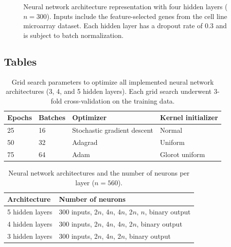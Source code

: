 \documentclass[10pt, letterpaper]{article}
\begin{document}
\begin{figure}[!ht]
    \caption{Neural network architecture representation with four hidden layers ($n=300$). Inputs include the feature-selected genes from the cell line microarray dataset. Each hidden layer has a dropout rate of 0.3 and is subject to batch normalization.}
    \label{fig:neural_vis}
\end{figure}


\subsection*{Tables}
\begin{table}[!ht]
    \caption{Grid search parameters to optimize all implemented neural network architectures (3, 4, and 5 hidden layers). Each grid search underwent 3-fold cross-validation on the training data.}
    \centering
    \label{tab:params}
    \begin{tabular}{l l l l}
        \toprule
        Epochs & Batches & Optimizer & Kernel initializer \\
        \midrule
        25 & 16 & Stochastic gradient descent & Normal \\
        50 & 32 & Adagrad & Uniform \\
        75 & 64 & Adam & Glorot uniform \\
        \bottomrule
    \end{tabular}
\end{table}


\begin{table}[!ht]
	\caption{Neural network architectures and the number of neurons per layer ($n=560$).}	\label{tab:architectures}
	\centering
	\begin{tabular}{l l}
		\toprule
		Architecture & Number of neurons \\
		\midrule
		 5 hidden layers & 300 inputs, 2$n$, 4$n$, 4$n$, 2$n$, $n$, binary output \\
		 4  hidden layers & 300 inputs, 2$n$, 4$n$, 4$n$, 2$n$, binary output \\
		 3 hidden layers & 300 inputs, 2$n$, 4$n$, 2$n$, binary output \\
		\bottomrule
	\end{tabular}
\end{table}
\end{document}

